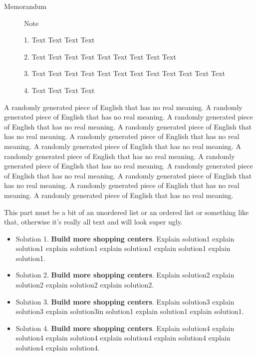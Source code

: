\documentclass[12pt]{ctexart}
\begin{document}
\begin{letter}{ \centering Memorandum }
\begin{figure}
\begin{tcolorbox}
		\begin{center}
			\fontsize{20pt}{1}\selectfont{}
			Note
		\end{center}

		\vspace{-0.2cm}

		1. Text Text Text Text
		
		2. Text Text Text Text Text Text Text Text Text
		
		3. Text Text Text Text Text Text Text Text Text Text Text Text 
		
		4. Text Text Text Text 
		\vspace{0.3cm}
	\end{tcolorbox}
	\end{figure}
	A randomly generated piece of English that has no real meaning. A randomly generated piece of English that has no real meaning. A randomly generated piece of English that has no real meaning. A randomly generated piece of English that has no real meaning. A randomly generated piece of English that has no real meaning. A randomly generated piece of English that has no real meaning. A randomly generated piece of English that has no real meaning. A randomly generated piece of English that has no real meaning. A randomly generated piece of English that has no real meaning. A randomly generated piece of English that has no real meaning. A randomly generated piece of English that has no real meaning. A randomly generated piece of English that has no real meaning. 

	This part must be a bit of an unordered list or an ordered list or something like that, otherwise it's really all text and will look super ugly.


	\begin{itemize}
	\item Solution 1. \textbf{Build more shopping centers}. Explain solution1 explain solution1 explain solution1 explain solution1 explain solution1 explain solution1.
	\item Solution 2. \textbf{Build more shopping centers}. Explain solution2 explain solution2 explain solution2 explain solution2.
	\item Solution 3. \textbf{Build more shopping centers}. Explain solution3 explain solution3 explain solution3in solution1 explain solution1 explain solution1.
	\item Solution 4. \textbf{Build more shopping centers}. Explain solution4 explain solution4 explain solution4 explain solution4 explain solution4 explain solution4 explain solution4.
	\end{itemize}


\end{letter}
\end{document}
